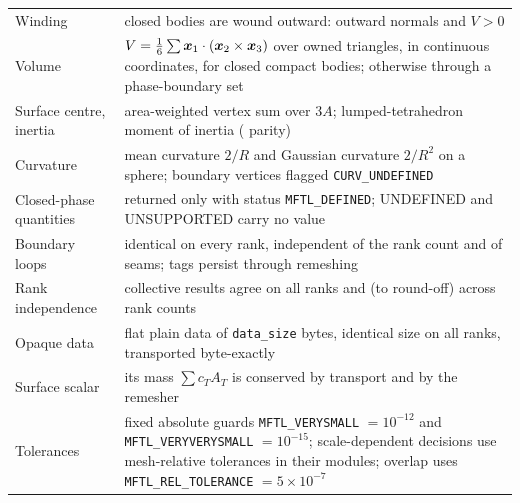 \begin{center}
\begin{longtable}{@{}p{}p{}@{}}
Winding & closed bodies are wound outward: outward normals and $V>0$ \\
Volume & $V=\frac16\sum\boldsymbol{x}_1\cdot(\boldsymbol{x}_2\times\boldsymbol{x}_3)$ over owned triangles, in continuous coordinates, for closed compact bodies; otherwise through a phase-boundary set \\
Surface centre, inertia & area-weighted vertex sum over $3A$; lumped-tetrahedron moment of inertia (\mftlone{} parity) \\
Curvature & mean curvature $2/R$ and Gaussian curvature $2/R^2$ on a sphere; boundary vertices flagged \texttt{CURV\_UNDEFINED} \\
Closed-phase quantities & returned only with status \texttt{MFTL\_DEFINED}; UNDEFINED and UNSUPPORTED carry no value \\
Boundary loops & identical on every rank, independent of the rank count and of seams; tags persist through remeshing \\
Rank independence & collective results agree on all ranks and (to round-off) across rank counts \\
Opaque data & flat plain data of \texttt{data\_size} bytes, identical size on all ranks, transported byte-exactly \\
Surface scalar & its mass $\sum c_TA_T$ is conserved by transport and by the remesher \\
Tolerances & fixed absolute guards \texttt{MFTL\_VERYSMALL} $=10^{-12}$ and \texttt{MFTL\_VERYVERYSMALL} $=10^{-15}$; scale-dependent decisions use mesh-relative tolerances in their modules; overlap uses \texttt{MFTL\_REL\_TOLERANCE} $=5\times10^{-7}$ \\
\bottomrule
\end{longtable}
\end{center}
